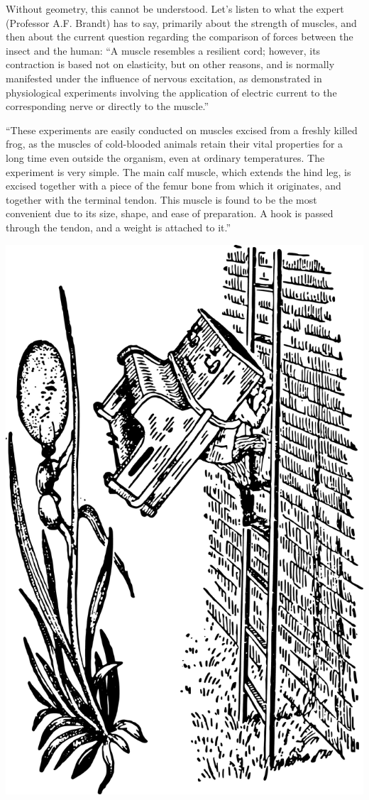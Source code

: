 Without geometry, this cannot be understood. Let's listen to what the expert (Professor A.F. Brandt) has to say, primarily about the strength of muscles, and then about the current question regarding the comparison of forces between the insect and the human: ``A muscle resembles a resilient cord; however, its contraction is based not on elasticity, but on other reasons, and is normally manifested under the influence of nervous excitation, as demonstrated in physiological experiments involving the application of electric current to the corresponding nerve or directly to the muscle.''

``These experiments are easily conducted on muscles excised from a freshly killed frog, as the muscles of cold-blooded animals retain their vital properties for a long time even outside the organism, even at ordinary temperatures. The experiment is very simple. The main calf muscle, which extends the hind leg, is excised together with a piece of the femur bone from which it originates, and together with the terminal tendon. This muscle is found to be the most convenient due to its size, shape, and ease of preparation. A hook is passed through the tendon, and a weight is attached to it.'' 

\begin{marginfigure}[-3cm]%
\centering
\includegraphics[width=\textwidth]{figures/ch-01/fig-01-24.pdf}
\end{marginfigure}



